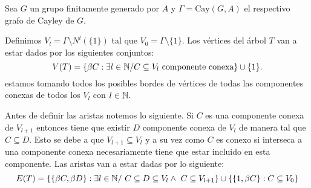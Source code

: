 \documentclass[tesis.tex]{subfiles}
\begin{document}
\begin{deff}
	\label{desc-grafo-cayley}
	
	Sea $G$ un grupo finitamente generado por $A$ y $\Gamma = \text{Cay}(G,A)$ el respectivo grafo de Cayley de $G$. 
	

	Definimos $V_l = \Gamma \setminus N^l(\{1\}) $ tal que $V_0 = \Gamma \setminus \{1\}$. 
	Los vértices del árbol $T$ van a estar dados por los siguientes conjuntos:
	\[
	V(T) = \{  \beta C : \exists l \in \mathbb{N} / C \subseteq V_l \ \text{componente conexa} \} \cup \{ 1 \}.
	\]
	estamos tomando todos los posibles bordes de vértices 
	de todas las componentes conexas de todos los $V_l$ con $l \in \mathbb{N}$.
	 
	Antes de definir las aristas notemos lo siguiente.
	Si $C$ es una componente conexa de $V_{l+1}$ entonces tiene que existir $D$ componente conexa de $V_{l}$ de manera tal que $C \subseteq D$.
	Esto se debe a que $V_{l+1} \subseteq V_{l}$ y a su vez como $C$ es conexo si interseca a una componente conexa necesariamente tiene que estar incluido en esta componente.
	Las aristas van a estar dadas por lo siguiente:
	\[
	E(T) = \{ \{ \beta C, \beta D \} : \exists l \in \mathbb{N} / \ C \subseteq D \subseteq V_l \land \ C \subseteq V_{l+1}  \} \cup \{  \{1,\beta C\} : C \subseteq V_0  \}
	\]
	
	 
	
	

\end{deff}
\end{document}
